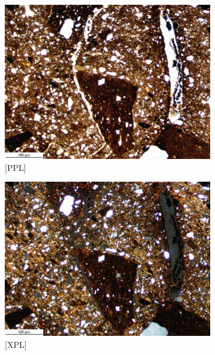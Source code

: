 \documentclass[a4paper]{article}
\begin{document}
\begin{figure}[H]
	\centering
	\begin{subfigure}[t]{.49\textwidth}
		\includegraphics[width=\textwidth]{ThinSections/44-1_4x_PPL.jpg}
		\caption{[PPL]}
	\end{subfigure}\hspace{.5em}\hfill
	\begin{subfigure}[t]{.49\textwidth}
		\includegraphics[width=\textwidth]{ThinSections/44-1_4x_XPL.jpg}
		\caption{[XPL]}
	\end{subfigure}
	\begin{subfigure}[t]{.49\textwidth}

\end{subfigure}
\end{figure}
\end{document}
